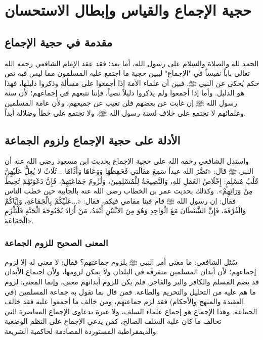 \chapter{حجية الإجماع والقياس وإبطال الاستحسان}

\section{مقدمة في حجية الإجماع}
الحمد لله والصلاة والسلام على رسول الله، أما بعد؛ فقد عقد الإمام الشافعي رحمه الله تعالى باباً نفيساً في "الإجماع" ليبين حجية ما اجتمع عليه المسلمون مما ليس فيه نص حكم يُحكى عن النبي ﷺ.
فبين أن علماء الأمة إذا أجمعوا على مسألة وذكروا دليلها، فهذا هو الدليل. وأما إذا أجمعوا ولم يذكروا دليلاً نصياً، فإننا نتبعهم في إجماعهم؛ لأن سنة رسول الله ﷺ إن غابت عن بعضهم فلن تغيب عن جميعهم، ولأن عامة المسلمين وعلمائهم لا تجتمع على خلاف لسنة رسول الله ﷺ، ولا تجتمع على خطأ وضلالة أبداً.

\section{الأدلة على حجية الإجماع ولزوم الجماعة}
واستدل الشافعي رحمه الله على حجية الإجماع بحديث ابن مسعود رضي الله عنه أن النبي ﷺ قال: «نَضَّرَ الله عبداً سَمِعَ مَقَالَتي فَحَفِظَهَا وَوَعَاهَا وَأَدَّاهَا... ثَلَاثٌ لا يُغِلُّ عَلَيْهِنَّ قَلْبُ مُسْلِمٍ: إِخْلَاصُ العَمَلِ للهِ، وَالنَّصِيحَةُ لِلْمُسْلِمِينَ، وَلُزُومُ جَمَاعَتِهِمْ، فَإِنَّ دَعْوَتَهُمْ تُحِيطُ مِنْ وَرَائِهِمْ».
وكذلك بحديث عمر بن الخطاب رضي الله عنه بالجابية حين خطب الناس فقال: إن رسول الله ﷺ قام فينا مقامي فيكم، فقال: «...عَلَيْكُمْ بِالْجَمَاعَةِ، وَإِيَّاكُمْ وَالْفُرْقَةَ، فَإِنَّ الشَّيْطَانَ مَعَ الْوَاحِدِ وَهُوَ مِنَ الاثْنَيْنِ أَبْعَدُ، مَنْ أَرَادَ بُحْبُوحَةَ الْجَنَّةِ فَلْيَلْزَمِ الْجَمَاعَةَ».

\subsection{المعنى الصحيح للزوم الجماعة}
سُئل الشافعي: ما معنى أمر النبي ﷺ بلزوم جماعتهم؟
فقال: لا معنى له إلا لزوم إجماعهم؛ لأن أبدان المسلمين متفرقة في البلدان ولا يمكن لزومها، ولأن اجتماع الأبدان قد يضم المسلم والكافر والبر والفاجر. فلم يكن للزوم أبدانهم معنى، وإنما المعنى: لزوم ما هم عليه من التحليل والتحريم والطاعة. فمن قال بما تقول به جماعة المسلمين (في العقيدة والمنهج والأحكام) فقد لزم جماعتهم، ومن خالف ما أجمعوا عليه فقد خالف الجماعة.
وهذا الإجماع هو إجماع علماء السلف، ولا عبرة بدعاوى الإجماع المعاصرة التي تخالف ما كان عليه السلف الصالح، كمن يدعي الإجماع على النظم الوضعية والديمقراطية المستوردة المصادمة لحاكمية الشريعة.

